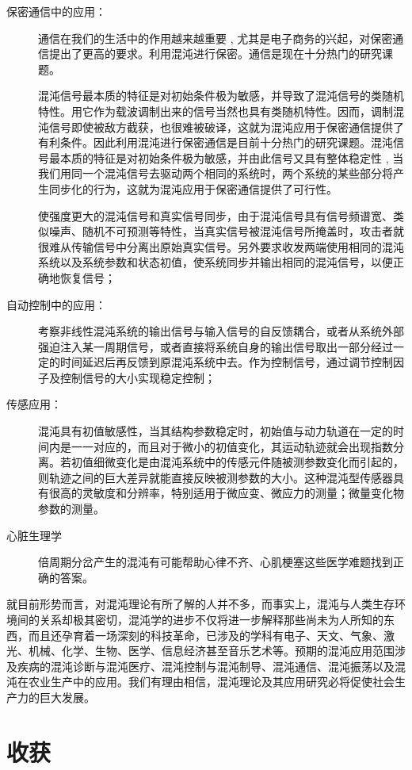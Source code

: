 \documentclass{article}
\begin{document}
\begin{description}
	\item[保密通信中的应用：]通信在我们的生活中的作用越来越重要 , 尤其是电子商务的兴起，对保密通信提出了更高的要求。利用混沌进行保密。通信是现在十分热门的研究课题。

		混沌信号最本质的特征是对初始条件极为敏感，并导致了混沌信号的类随机特性。用它作为载波调制出来的信号当然也具有类随机特性。因而，调制混沌信号即使被敌方截获，也很难被破译，这就为混沌应用于保密通信提供了有利条件。因此利用混沌进行保密通信是目前十分热门的研究课题。混沌信号最本质的特征是对初始条件极为敏感，并由此信号又具有整体稳定性 , 当我们用同一个混沌信号去驱动两个相同的系统时，两个系统的某些部分将产生同步化的行为，这就为混沌应用于保密通信提供了可行性。

		使强度更大的混沌信号和真实信号同步，由于混沌信号具有信号频谱宽、类似噪声、随机不可预测等特性，当真实信号被混沌信号所掩盖时，攻击者就很难从传输信号中分离出原始真实信号。另外要求收发两端使用相同的混沌系统以及系统参数和状态初值，使系统同步并输出相同的混沌信号，以便正确地恢复信号；
	\item[自动控制中的应用：]考察非线性混沌系统的输出信号与输入信号的自反馈耦合，或者从系统外部强迫注入某一周期信号，或者直接将系统自身的输出信号取出一部分经过一定的时间延迟后再反馈到原混沌系统中去。作为控制信号，通过调节控制因子及控制信号的大小实现稳定控制；
	\item[传感应用：]混沌具有初值敏感性，当其结构参数稳定时，初始值与动力轨道在一定的时间内是一一对应的，而且对于微小的初值变化，其运动轨迹就会出现指数分离。若初值细微变化是由混沌系统中的传感元件随被测参数变化而引起的，则轨迹之间的巨大差异就能直接反映被测参数的大小。这种混沌型传感器具有很高的灵敏度和分辨率，特别适用于微应变、微应力的测量；微量变化物参数的测量。
	\item[心脏生理学]倍周期分岔产生的混沌有可能帮助心律不齐、心肌梗塞这些医学难题找到正确的答案。
\end{description}

就目前形势而言，对混沌理论有所了解的人并不多，而事实上，混沌与人类生存环境间的关系却极其密切，混沌学的进步不仅将进一步解释那些尚未为人所知的东西，而且还孕育着一场深刻的科技革命，已涉及的学科有电子、天文、气象、激光、机械、化学、生物、医学、信息经济甚至音乐艺术等。预期的混沌应用范围涉及疾病的混沌诊断与混沌医疗、混沌控制与混沌制导、混沌通信、混沌振荡以及混沌在农业生产中的应用。我们有理由相信，混沌理论及其应用研究必将促使社会生产力的巨大发展。

\section{收获}%
\label{sec:收获}
\end{document}
